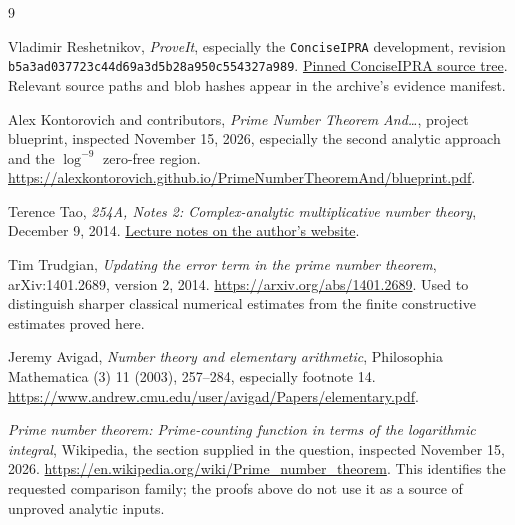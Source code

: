 \documentclass[11pt,letterpaper]{article}
\numberwithin{equation}{section}
\theoremstyle{definition}
\begin{document}
\begin{thebibliography}{9}
\raggedright
{}
Vladimir Reshetnikov, \emph{ProveIt}, especially the
\texttt{ConciseIPRA} development,
revision \texttt{b5a3ad037723c44d69a3d5b28a950c554327a989}.
\href{https://github.com/VladimirReshetnikov/ProveIt/tree/b5a3ad037723c44d69a3d5b28a950c554327a989/Logic/PrimitiveRecursiveArithmetic/ConciseIPRA}{Pinned ConciseIPRA source tree}.
Relevant source paths and blob hashes appear in the archive's evidence manifest.

Alex Kontorovich and contributors, \emph{Prime Number Theorem And\ldots},
project blueprint, inspected November 15, 2026, especially the second
analytic approach and the $\log^{-9}$ zero-free region.
\url{https://alexkontorovich.github.io/PrimeNumberTheoremAnd/blueprint.pdf}.

Terence Tao, \emph{254A, Notes 2: Complex-analytic multiplicative number theory},
December 9, 2014.
\href{https://terrytao.wordpress.com/2014/12/09/254a-notes-2-complex-analytic-multiplicative-number-theory/}{Lecture notes on the author's website}.

Tim Trudgian, \emph{Updating the error term in the prime number theorem},
arXiv:1401.2689, version 2, 2014.
\url{https://arxiv.org/abs/1401.2689}.
Used to distinguish sharper classical numerical estimates from the
finite constructive estimates proved here.

Jeremy Avigad, \emph{Number theory and elementary arithmetic},
Philosophia Mathematica (3) 11 (2003), 257--284, especially footnote 14.
\url{https://www.andrew.cmu.edu/user/avigad/Papers/elementary.pdf}.

\emph{Prime number theorem: Prime-counting function in terms of the
logarithmic integral}, Wikipedia, the section supplied in the question,
inspected November 15, 2026.
\url{https://en.wikipedia.org/wiki/Prime_number_theorem}.
This identifies the requested comparison family; the proofs above do not
use it as a source of unproved analytic inputs.
\end{thebibliography}
\end{document}
